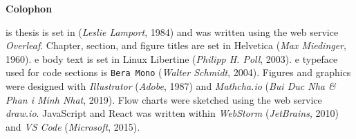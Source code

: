 \printbibliography[heading=bibintoc]



\vspace*{\fill} 
\textbf{{\Huge \textcolor{black!60}{ Colophon}}}
\vspace*{3mm}
\begin{addmargin}[1.3cm]{1.3cm}
	\textcolor{black!65}{
		\Th{}is thesis is set in \LaTeXe{} {\footnotesize (\textit{Leslie Lamport}, 1984}) and was written using the web service \textit{Overleaf}.
		Chapter, section, and figure titles are set in \textsf{Helvetica} {\footnotesize (\textit{Max Miedinger}, 1960)}. \Th{}e body text is set in Linux Libertine {\footnotesize (\textit{Philipp H. Poll}, 2003)}. \Th{}e typeface used for code sections is \texttt{Bera Mono} {\footnotesize (\textit{Walter Schmidt}, 2004)}.
		Figures and graphics were designed with \textit{Illustrator} {\footnotesize (\textit{Adobe}, 1987)} and \textit{Mathcha.io} {\footnotesize (\textit{Bui Duc Nha \& Phan \Th{}i Minh Nhat}, 2019)}. Flow charts were sketched using the web service \textit{draw.io}.
		JavaScript and React was written within \textit{WebStorm} {\footnotesize (\textit{JetBrains}, 2010)} and \textit{VS Code} {\footnotesize (\textit{Microsoft}, 2015)}.
	}
\end{addmargin}
